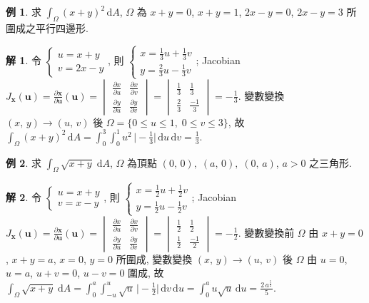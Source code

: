 \documentclass[12pt]{extarticle}
\newcommand{\ds}{\displaystyle}
\theoremstyle{definition}
\newtheorem*{ex}{例}
\newtheorem*{sol}{解}
\newcommand{\vu}{\mathbf{u}}
\newcommand{\vx}{\mathbf{x}}
\begin{document}
\begin{ex}
  求 $\ds\int_\Omega\!(x + y)^2\,\text{d}A$, $\Omega$ 為 $x + y = 0$, $x + y = 1$, $2x - y = 0$, $2x - y = 3$ 所圍成之平行四邊形. 
\end{ex}

\begin{sol}
  令 $\ds\begin{cases}u = x + y \\ v = 2x - y\end{cases}\!\!\!\!\!$, 則 $\ds\begin{cases}x = \frac{1}{3}u + \frac{1}{3}v \\ y = \frac{2}{3}u - \frac{1}{3}v\end{cases}\!\!\!\!\!$; Jacobian $\ds J_{\vx}(\vu) = \frac{\partial\vx}{\partial\vu}(\vu) = \begin{vmatrix}\frac{\partial x}{\partial u} & \frac{\partial x}{\partial v} \\ \frac{\partial y}{\partial u}& \frac{\partial y}{\partial v}\end{vmatrix} = \begin{vmatrix}\frac{1}{3} & \frac{1}{3} \\ \frac{2}{3} & \frac{-1}{3}\end{vmatrix} = -\frac{1}{3}$. 變數變換 $(x,\,y)\to(u,\,v)$ 後 $\Omega = \{0\leqslant u\leqslant 1,\;0\leqslant v\leqslant 3\}$, 故 $\ds\int_\Omega\!(x + y)^2\,\text{d}A = \int_0^3\!\int_0^1 u^2\,\Big|-\frac{1}{3}\Big|\,\text{d}u\,\text{d}v = \frac{1}{3}$.
\end{sol}

\begin{ex}
  求 $\ds\int_\Omega\!\sqrt{x + y}\;\text{d}A$, $\Omega$ 為頂點 $(0,\,0),\;(a,\,0),\;(0,\,a)$, $a > 0$ 之三角形. 
\end{ex}

\begin{sol}
  令 $\ds\begin{cases}u = x + y \\ v = x - y\end{cases}\!\!\!\!\!$, 則 $\ds\begin{cases}x = \frac{1}{2}u + \frac{1}{2}v \\ y = \frac{1}{2}u - \frac{1}{2}v\end{cases}\!\!\!\!\!$; Jacobian $\ds J_{\vx}(\vu) = \frac{\partial\vx}{\partial\vu}(\vu) = \begin{vmatrix}\frac{\partial x}{\partial u} & \frac{\partial x}{\partial v} \\ \frac{\partial y}{\partial u}& \frac{\partial y}{\partial v}\end{vmatrix} = \begin{vmatrix}\frac{1}{2} & \frac{1}{2} \\ \frac{1}{2} & \frac{-1}{2}\end{vmatrix} = -\frac{1}{2}$. 變數變換前 $\Omega$ 由 $x + y = 0$, $x + y = a$, $x = 0$, $y = 0$ 所圍成, 變數變換 $(x,\,y)\to(u,\,v)$ 後 $\Omega$ 由 $u = 0$, $u = a$, $u + v = 0$, $u - v = 0$ 圍成, 故 $\ds\int_\Omega\!\sqrt{x + y}\;\text{d}A = \int_0^a\!\int_{-u}^{u}\!\sqrt{u}\,\Big|-\frac{1}{2}\Big|\,\text{d}v\,\text{d}u = \int_0^a\!u\sqrt{u}\,\text{d}u = \frac{2\,a^{\frac{5}{2}}}{5}$.
\end{sol}
\end{document}
